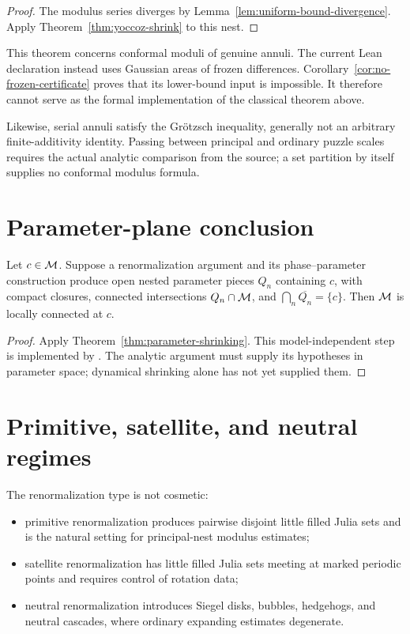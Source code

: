 \begin{proof}
The modulus series diverges by Lemma~\ref{lem:uniform-bound-divergence}.
Apply Theorem~\ref{thm:yoccoz-shrink} to this nest.
\end{proof}

This theorem concerns conformal moduli of genuine annuli.  The current
Lean declaration
instead uses Gaussian areas of frozen differences.
Corollary~\ref{cor:no-frozen-certificate} proves that its lower-bound
input is impossible.  It therefore cannot serve as the formal
implementation of the classical theorem above.

Likewise, serial annuli satisfy the Grötzsch inequality, generally not
an arbitrary finite-additivity identity.  Passing between principal
and ordinary puzzle scales requires the actual analytic comparison
from the source; a set partition by itself supplies no conformal
modulus formula.

\section{Parameter-plane conclusion}

\begin{theorem}
\label{thm:satellite-apriori-mlc}
Let $c\in\mathcal M$.  Suppose a renormalization argument and its
phase--parameter construction produce open nested parameter pieces
$Q_n$ containing $c$, with compact closures, connected intersections
$Q_n\cap\mathcal M$, and
$\bigcap_n\overline{Q_n}=\{c\}$.
Then $\mathcal M$ is locally connected at $c$.
\end{theorem}

\begin{proof}
Apply Theorem~\ref{thm:parameter-shrinking}.  This model-independent
step is implemented by
.
The analytic argument must supply its hypotheses in parameter space;
dynamical shrinking alone has not yet supplied them.
\end{proof}

\section{Primitive, satellite, and neutral regimes}

The renormalization type is not cosmetic:
\begin{itemize}
\item primitive renormalization produces pairwise disjoint little filled Julia sets and
      is the natural setting for principal-nest modulus estimates;
\item satellite renormalization has little filled Julia sets meeting at
      marked periodic points and requires control of rotation data;
\item neutral renormalization introduces Siegel disks, bubbles, hedgehogs,
      and neutral cascades, where ordinary expanding estimates degenerate.
\end{itemize}

